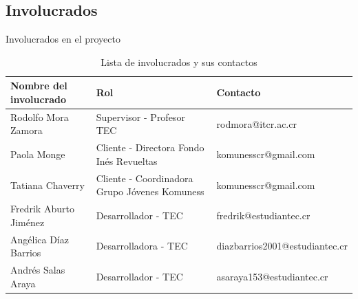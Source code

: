\subsection{Involucrados}

\begin{table}[H]
\caption{Involucrados en el proyecto}
\label{tab:involucrados}
\centering
\small
\begin{tabular}{|l|l|l|}
\hline
\textbf{Nombre del involucrado} & \textbf{Rol} & \textbf{Contacto} \\
\hline \hline
Rodolfo Mora Zamora & Supervisor - Profesor TEC & rodmora@itcr.ac.cr \\
\hline
Paola Monge & Cliente - Directora Fondo Inés Revueltas & komunesscr@gmail.com \\
\hline
Tatiana Chaverry & Cliente - Coordinadora Grupo Jóvenes Komuness & komunesscr@gmail.com \\
\hline
Fredrik Aburto Jiménez & Desarrollador - TEC & fredrik@estudiantec.cr \\
\hline
Angélica Díaz Barrios & Desarrolladora - TEC & diazbarrios2001@estudiantec.cr \\
\hline
Andrés Salas Araya & Desarrollador - TEC & asaraya153@estudiantec.cr \\
\hline
\end{tabular}
\caption{Lista de involucrados y sus contactos}
\end{table}

